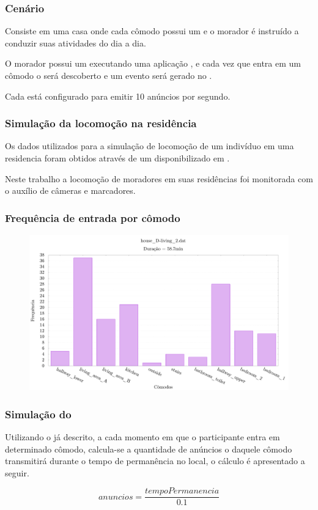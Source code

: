 \documentclass[aspectratio=169]{beamer}
\begin{document}
\begin{frame}
	\frametitle{Cenário}
	Consiste em uma casa onde cada cômodo possui um \beacon \ble e o morador é instruído a conduzir suas atividades do dia a dia.

	\bigskip
	
	O morador possui um \smartphone executando uma aplicação \mhubcddl, e cada vez que entra em um cômodo o \beacon será descoberto e um evento será gerado no \stwopa.

	\bigskip
	
	Cada \beacon está configurado para emitir 10 anúncios por segundo.
\end{frame}

\begin{frame}
	\frametitle{Simulação da locomoção na residência}
	Os dados utilizados para a simulação de locomoção de um indivíduo em uma residencia foram obtidos através de um \dataset disponibilizado em \cite{byrne:et-al:2018}.

	\bigskip

	Neste trabalho a locomoção de moradores em suas residências foi monitorada com o auxílio de câmeras e marcadores.
\end{frame}

\begin{frame}
	\frametitle{Frequência de entrada por cômodo}
	\begin{figure}
		\centering
		\includegraphics[width=.80\linewidth]{img/dataset-histogram.pdf}
	\end{figure}
\end{frame}

\begin{frame}
	\frametitle{Simulação do \beacons}
	Utilizando o \dataset já descrito, a cada momento em que o participante entra em determinado cômodo, calcula-se a quantidade de anúncios o \beacon daquele cômodo transmitirá durante o tempo de permanência no local, o cálculo é apresentado a seguir.
	
	\begin{equation}
		anuncios = \frac{tempoPermanencia}{0.1} 
	\end{equation}
\end{frame}
\end{document}
